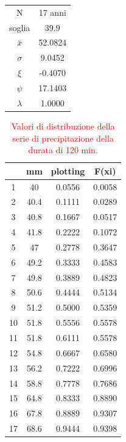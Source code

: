 \begin{table}[H]
\begin{minipage}{.5\linewidth}
\begin{tabular}{cc}
            N        & 17 anni \\
            soglia   &     39.9    \\
            $\bar{x}$ &   52.0824     \\
            $\sigma$ &     9.0452    \\
            $\xi$      &     -0.4070  \\
            $\psi$      &   17.1403  \\
            $\lambda$   &   1.0000 \\
        \bottomrule           
        \end{tabular}
    \end{minipage} 
\end{table}

\begin{table}[H] \centering
    \caption{\textcolor{red}{Valori di distribuzione della serie di precipitazione della durata di 120 min.}}
        \begin{tabular}{cccc}
            \toprule
           & mm   & plotting & F(xi)  \\
        \midrule
        1  & 40   & 0.0556   & 0.0058 \\
        2  & 40.4 & 0.1111   & 0.0289 \\
        3  & 40.8 & 0.1667   & 0.0517 \\
        4  & 41.8 & 0.2222   & 0.1072 \\
        5  & 47   & 0.2778   & 0.3647 \\
        6  & 49.2 & 0.3333   & 0.4583 \\
        7  & 49.8 & 0.3889   & 0.4823 \\
        8  & 50.6 & 0.4444   & 0.5134 \\
        9  & 51.2 & 0.5000   & 0.5359 \\
        10 & 51.8 & 0.5556   & 0.5578 \\
        11 & 51.8 & 0.6111   & 0.5578 \\
        12 & 54.8 & 0.6667   & 0.6580 \\
        13 & 56.2 & 0.7222   & 0.6996 \\
        14 & 58.8 & 0.7778   & 0.7686 \\
        15 & 64.8 & 0.8333   & 0.8890 \\
        16 & 67.8 & 0.8889   & 0.9307 \\
        17 & 68.6 & 0.9444   & 0.9398 \\
        \bottomrule
        \end{tabular}
\end{table}

